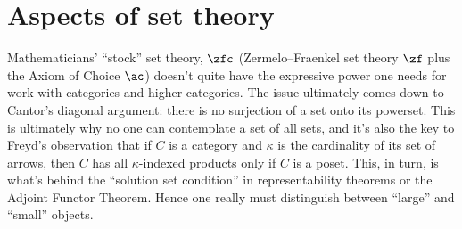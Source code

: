 
\chapter{Aspects of set theory}%
\label{cha:aspects_of_set_theory}

Mathematicians' \enquote{stock} set theory, $\zfc$
(Zermelo--Fraenkel set theory $\zf$ plus the Axiom of Choice $\ac$)
doesn't quite have the expressive power one needs for work with categories and higher categories.
The issue ultimately comes down to Cantor's diagonal argument:
there is no surjection of a set onto its powerset.
This is ultimately why no one can contemplate a set of all sets,
and it's also the key to Freyd's observation that
if $C$ is a category and $\kappa$ is the cardinality of its set of arrows,
then $C$ has all $\kappa$-indexed products only if $C$ is a poset.
This, in turn, is what's behind the \enquote{solution set condition}
in representability theorems or the Adjoint Functor Theorem.
Hence one really must distinguish between \enquote{large} and \enquote{small} objects.

